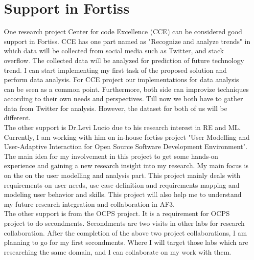 \section{Support in Fortiss}

One research project Center for code Excellence (CCE) can be considered good support in Fortiss. CCE has one part named as "Recognize and analyze trends" in which data will be collected from social media such as Twitter, and stack overflow. The collected data will be analyzed for prediction of future technology trend. I can start implementing my first task of the proposed solution and perform data analysis. For CCE project our implementations for data analysis can be seen as a common point. Furthermore, both side can improvize techniques according to their own needs and perspectives. Till now we both have to gather data from Twitter for analysis. However, the dataset for both of us will be different.\\  

	The other support is Dr.Levi Lucio due to his research interest in RE and ML. Currently, I am working with him on in-house fortiss project "User Modelling and User-Adaptive Interaction for Open Source Software Development Environment". The main idea for my involvement in this project to get some hands-on experience and gaining a new research insight into my research. My main focus is on the on the user modelling and analysis part. This project mainly deals with requirements on user needs, use case definition and requirements mapping and modeling user behavior and skills. This project will also help me to understand my future research integration and collaboration in AF3.\\ 
	
	The other support is from the OCPS project. It is a requirement for OCPS project to do secondments. Secondments are two visits in other labs for research collaboration. After the completion of the above two project collaborations, I am planning to go for my first secondments. Where I will target those labs which are researching the same domain, and I can collaborate on my work with them.